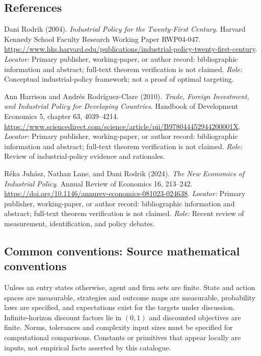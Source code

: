 \documentclass[11pt,a4paper]{article}
\begin{document}
\subsection*{References}
\begin{enumerate}[label=\textnormal{[S\arabic*]},leftmargin=*]
\item Dani Rodrik (2004). \emph{Industrial Policy for the Twenty-First Century}. Harvard Kennedy School Faculty Research Working Paper RWP04-047. \url{https://www.hks.harvard.edu/publications/industrial-policy-twenty-first-century}. \textit{Locator:} Primary publisher, working-paper, or author record: bibliographic information and abstract; full-text theorem verification is not claimed. \textit{Role:} Conceptual industrial-policy framework; not a proof of optimal targeting.
\item Ann Harrison and Andrés Rodríguez-Clare (2010). \emph{Trade, Foreign Investment, and Industrial Policy for Developing Countries}. Handbook of Development Economics 5, chapter 63, 4039--4214. \url{https://www.sciencedirect.com/science/article/pii/B978044452944200001X}. \textit{Locator:} Primary publisher, working-paper, or author record: bibliographic information and abstract; full-text theorem verification is not claimed. \textit{Role:} Review of industrial-policy evidence and rationales.
\item Réka Juhász, Nathan Lane, and Dani Rodrik (2024). \emph{The New Economics of Industrial Policy}. Annual Review of Economics 16, 213--242. \url{https://doi.org/10.1146/annurev-economics-081023-024638}. \textit{Locator:} Primary publisher, working-paper, or author record: bibliographic information and abstract; full-text theorem verification is not claimed. \textit{Role:} Recent review of measurement, identification, and policy debates.
\end{enumerate}

\subsection*{Common conventions: Source mathematical conventions}

Unless an entry states otherwise, agent and firm sets are finite. State and action spaces are measurable, strategies and outcome maps are measurable, probability laws are specified, and expectations exist for the targets under discussion. Infinite-horizon discount factors lie in $(0,1)$ and discounted objectives are finite. Norms, tolerances and complexity input sizes must be specified for computational comparisons. Constants or primitives that appear locally are inputs, not empirical facts asserted by this catalogue.
\end{document}

